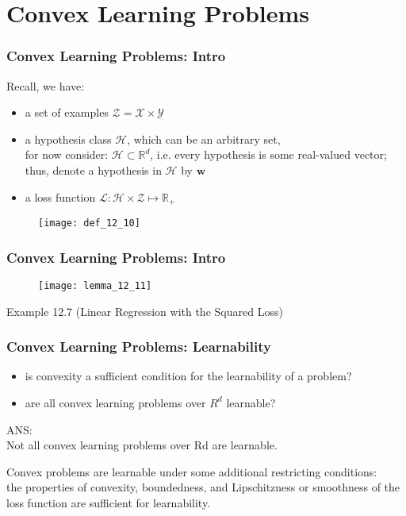 \section{Convex Learning Problems}


\begin{frame}
\frametitle{Convex Learning Problems: Intro}

Recall, we have:
\begin{itemize}
    \item a set of examples $\mathcal{Z} = \mathcal{X} \times \mathcal{Y}$
    \item a hypothesis class $\mathcal{H}$, which can be an arbitrary set,\\
    for now consider: $ \mathcal{H} \subset \mathbb{R}^d$, i.e.
    every hypothesis is some real-valued vector;
    thus, denote a hypothesis in $\mathcal{H}$ by $\mathbf{w}$
    \item a loss function $\mathcal{L}: \mathcal{H} \times \mathcal{Z} \mapsto \mathbb{R_{+}}$
\end{itemize}

\begin{figure}
    \centering
    \texttt{[image: def\_12\_10]}
\end{figure}

\end{frame}

\begin{frame}
\frametitle{Convex Learning Problems: Intro}

\begin{figure}
    \centering
    \texttt{[image: lemma\_12\_11]}
\end{figure}

Example 12.7 (Linear Regression with the Squared Loss)

\end{frame}

\begin{frame}
\frametitle{Convex Learning Problems: Learnability}
\begin{itemize}
    \item is convexity a sufficient condition for the learnability of a problem?
    \item are all convex learning problems over $R^d$ learnable?
\end{itemize}

ANS:\\
Not all convex learning problems over Rd are learnable.

Convex problems are learnable under some additional restricting conditions:\\
the properties of convexity, boundedness, and Lipschitzness or smoothness of the
loss function are sufficient for learnability.

\end{frame}

